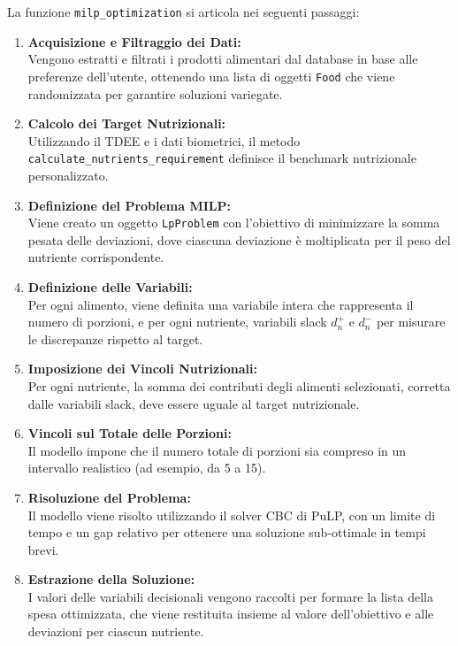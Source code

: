 \documentclass[11pt,a4paper]{article}
\begin{document}
La funzione \texttt{milp\_optimization} si articola nei seguenti passaggi:
\begin{enumerate}
    \item \textbf{Acquisizione e Filtraggio dei Dati:} \\
    Vengono estratti e filtrati i prodotti alimentari dal database in base alle preferenze dell'utente, ottenendo una lista di oggetti \texttt{Food} che viene randomizzata per garantire soluzioni variegate.
    
    \item \textbf{Calcolo dei Target Nutrizionali:} \\
    Utilizzando il TDEE e i dati biometrici, il metodo \texttt{calculate\_nutrients\_requirement} definisce il benchmark nutrizionale personalizzato.
    
    \item \textbf{Definizione del Problema MILP:} \\
    Viene creato un oggetto \texttt{LpProblem} con l’obiettivo di minimizzare la somma pesata delle deviazioni, dove ciascuna deviazione è moltiplicata per il peso del nutriente corrispondente.
    
    \item \textbf{Definizione delle Variabili:} \\
    Per ogni alimento, viene definita una variabile intera che rappresenta il numero di porzioni, e per ogni nutriente, variabili slack \(d^+_n\) e \(d^-_n\) per misurare le discrepanze rispetto al target.
    
    \item \textbf{Imposizione dei Vincoli Nutrizionali:} \\
    Per ogni nutriente, la somma dei contributi degli alimenti selezionati, corretta dalle variabili slack, deve essere uguale al target nutrizionale.
    
    \item \textbf{Vincoli sul Totale delle Porzioni:} \\
    Il modello impone che il numero totale di porzioni sia compreso in un intervallo realistico (ad esempio, da 5 a 15).
    
    \item \textbf{Risoluzione del Problema:} \\
    Il modello viene risolto utilizzando il solver CBC di PuLP, con un limite di tempo e un gap relativo per ottenere una soluzione sub-ottimale in tempi brevi.
    
    \item \textbf{Estrazione della Soluzione:} \\
    I valori delle variabili decisionali vengono raccolti per formare la lista della spesa ottimizzata, che viene restituita insieme al valore dell’obiettivo e alle deviazioni per ciascun nutriente.
\end{enumerate}
\end{document}
